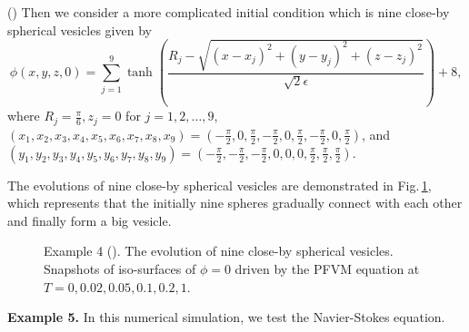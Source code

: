 \documentclass[final,review,onefignum,onetabnum]{siamart190516}
\theoremstyle{plain}
\begin{document}
()
Then we consider a more complicated initial condition which is nine close-by spherical vesicles given by 
\begin{equation}
\phi(x, y, z, 0)=\sum_{j=1}^{9} \tanh \left(\frac{R_{j}-\sqrt{\left(x-x_{j}\right)^{2}+\left(y-y_{j}\right)^{2}+\left(z-z_{j}\right)^{2}}}{\sqrt{2} \epsilon}\right)+8,
\end{equation}
where $R_{j}=\frac{\pi}{6}, z_{j}=0$ for $j=1,2, \ldots, 9$,  $\left(x_{1}, x_{2}, x_{3}, x_{4}, x_{5}, x_{6}, x_{7}, x_{8}, x_{9}\right)=\left(-\frac{\pi}{2}, 0, \frac{\pi}{2},  -\frac{\pi}{2}, 0, \frac{\pi}{2}, -\frac{\pi}{2}, 0, \frac{\pi}{2}\right)$, and
$\left(y_{1}, y_{2}, y_{3}, y_{4}, y_{5}, y_{6}, y_{7}, y_{8}, y_{9}\right)=\left(-\frac{\pi}{2}, -\frac{\pi}{2}, -\frac{\pi}{2}, 0, 0, 0, \frac{\pi}{2}, \frac{\pi}{2}, \frac{\pi}{2}\right)$. 

The evolutions of nine close-by spherical vesicles are demonstrated in Fig.\,\ref{Fig:PFVM-RESAV1-nine-balls}, which represents that the initially nine spheres gradually connect with each other and finally form a big vesicle. 

\begin{figure}[htbp]
\centering
{} 
\label{Fig:PFVM-RESAV1-nine-balls}
\caption{Example 4 (). The evolution of nine close-by spherical vesicles. Snapshots of iso-surfaces of $\phi=0$ driven by the PFVM equation at $T=0, 0.02, 0.05, 0.1, 0.2, 1$.}
\end{figure}
 
\textbf{Example 5.} In this numerical simulation, we test the Navier-Stokes equation. 
\end{document}
